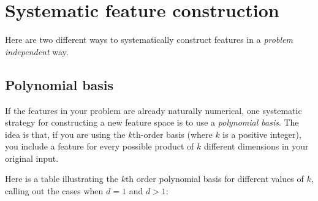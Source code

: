 \begin{examplebox}
  \begin{center}
  \end{center}
\end{examplebox}




\section{Systematic feature construction}
Here are two different ways to systematically construct features in a
  {\em problem independent} way.

\subsection{Polynomial basis}

\label{polyBasis}

If the features in your problem are already naturally numerical, one
systematic strategy for constructing a new feature space is to use a
  {\em polynomial basis}.  The idea is that, if you are using the
$k$th-order basis (where $k$ is a positive integer), you include a
feature for every possible product of $k$ different dimensions in your
original input.

Here is a table illustrating the $k$th order polynomial basis for
different values of $k$, calling out the cases when $d=1$ and $d>1$:

